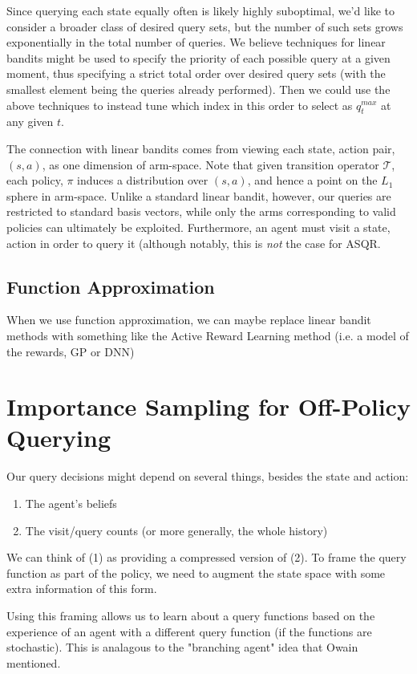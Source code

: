 \documentclass{article}
\begin{document}
Since querying each state equally often is likely highly suboptimal, we'd like to consider a broader class of desired query sets, but the number of such sets grows exponentially in the total number of queries.
We believe techniques for linear bandits might be used to specify the priority of each possible query at a given moment, thus specifying a strict total order over desired query sets (with the smallest element being the queries already performed).
Then we could use the above techniques to instead tune which index in this order to select as $q^{max}_t$ at any given $t$.

The connection with linear bandits comes from viewing each state, action pair, $(s,a)$, as one dimension of arm-space.
Note that given transition operator $\mathcal{T}$, each policy, $\pi$ induces a distribution over $(s,a)$, and hence a point on the $L_1$ sphere in arm-space.
Unlike a standard linear bandit, however, our queries are restricted to standard basis vectors, while only the arms corresponding to valid policies can ultimately be exploited.
Furthermore, an agent must visit a state, action in order to query it (although notably, this is \emph{not} the case for ASQR.

\subsection{Function Approximation}
When we use function approximation, we can maybe replace linear bandit methods with something like the Active Reward Learning method (i.e. a model of the rewards, GP or DNN)



\section{Importance Sampling for Off-Policy Querying}
Our query decisions might depend on several things, besides the state and action:
\begin{enumerate}
\item The agent's beliefs
\item The visit/query counts (or more generally, the whole history)
\end{enumerate}

We can think of (1) as providing a compressed version of (2).  
To frame the query function as part of the policy, we need to augment the state space with some extra information of this form.

Using this framing allows us to learn about a query functions based on the experience of an agent with a different query function (if the functions are stochastic).
This is analagous to the "branching agent" idea that Owain mentioned.








%

\end{document}
